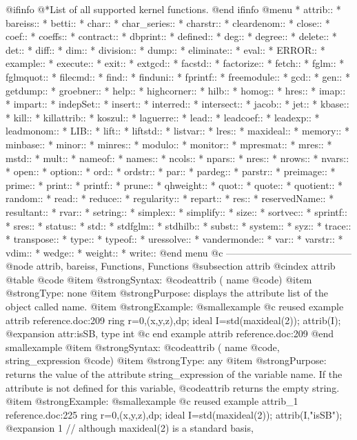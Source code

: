 @ifinfo
@*List of all supported kernel functions.
@end ifinfo
@menu
* attrib::
* bareiss::
* betti::
* char::
* char_series::
* charstr::
* cleardenom::
* close::
* coef::
* coeffs::
* contract::
* dbprint::
* defined::
* deg::
* degree::
* delete::
* det::
* diff::
* dim::
* division::
* dump::
* eliminate::
* eval::
* ERROR::
* example::
* execute::
* exit::
* extgcd::
* facstd::
* factorize::
* fetch::
* fglm::
* fglmquot::
* filecmd::
* find::
* finduni::
* fprintf::
* freemodule::
* gcd::
* gen::
* getdump::
* groebner::
* help::
* highcorner::
* hilb::
* homog::
* hres::
* imap::
* impart::
* indepSet::
* insert::
* interred::
* intersect::
* jacob::
* jet::
* kbase::
* kill::
* killattrib::
* koszul::
* laguerre::
* lead::
* leadcoef::
* leadexp::
* leadmonom::
* LIB::
* lift::
* liftstd::
* listvar::
* lres::
* maxideal::
* memory::
* minbase::
* minor::
* minres::
* modulo::
* monitor::
* mpresmat::
* mres::
* mstd::
* mult::
* nameof::
* names::
* ncols::
* npars::
* nres::
* nrows::
* nvars::
* open::
* option::
* ord::
* ordstr::
* par::
* pardeg::
* parstr::
* preimage::
* prime::
* print::
* printf::
* prune::
* qhweight::
* quot::
* quote::
* quotient::
* random::
* read::
* reduce::
* regularity::
* repart::
* res::
* reservedName::
* resultant::
* rvar::
* setring::
* simplex::
* simplify::
* size::
* sortvec::
* sprintf::
* sres::
* status::
* std::
* stdfglm::
* stdhilb::
* subst::
* system::
* syz::
* trace::
* transpose::
* type::
* typeof::
* uressolve::
* vandermonde::
* var::
* varstr::
* vdim::
* wedge::
* weight::
* write::
@end menu
@c ---------------------------------------
@node attrib, bareiss, Functions, Functions
@subsection attrib
@cindex attrib
@table @code
@item @strong{Syntax:}
@code{attrib (} name @code{)}
@item @strong{Type:}
none
@item @strong{Purpose:}
displays the attribute list of the object called name.
@item @strong{Example:}
@smallexample
@c reused example attrib reference.doc:209 
  ring r=0,(x,y,z),dp;
  ideal I=std(maxideal(2));
  attrib(I);
@expansion{} attr:isSB, type int
@c end example attrib reference.doc:209
@end smallexample
@item @strong{Syntax:}
@code{attrib (} name @code{,} string_expression @code{)}
@item @strong{Type:}
any
@item @strong{Purpose:}
returns the value of the attribute string_expression of the
variable name. If the attribute is not defined for this variable,
@code{attrib} returns the empty string.
@item @strong{Example:}
@smallexample
@c reused example attrib_1 reference.doc:225 
  ring r=0,(x,y,z),dp;
  ideal I=std(maxideal(2));
  attrib(I,"isSB");
@expansion{} 1
  // although maxideal(2) is a standard basis,
